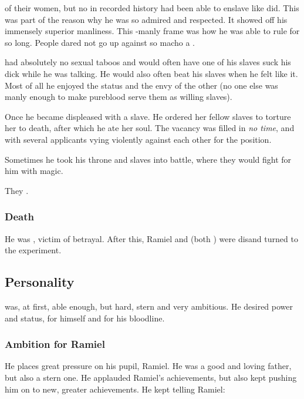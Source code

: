  of their women, but no \resphan{} in recorded history had been able to enslave \resviel{} like \Zachirah{} did. 
This was part of the reason why he was so admired and respected. 
It showed off his immensely superior manliness. 
This \uber-manly frame was how he was able to rule \Mystraacht{} for so long. 
People dared not go up against so macho a \resphan. 

\Zachirah{} had absolutely no sexual taboos and would often have one of his slaves suck his dick while he was talking. 
He would also often beat his slaves when he felt like it. 
Most of all he enjoyed the status and the envy of the other \resphain{} (no one else was manly enough to make pureblood \resviel{} serve them as willing slaves). 

Once he became displeased with a slave. 
He ordered her fellow slaves to torture her to death, after which he ate her soul. 
The vacancy was filled in \emph{no time}, and with several applicants vying violently against each other for the position. 

Sometimes he took his throne and slaves into battle, where they would fight for him with magic. 

They . 





\subsubsection{Death}
He was , victim of betrayal. 
After this, Ramiel and \Shiaraid{} (both \Mystraacht) were dis\honoured and turned to the \Malach{} experiment. 









\subsection{Personality}
\Zachirah{} was, at first, \honour{}able enough, but hard, stern and very ambitious. 
He desired power and status, for himself and for his bloodline. 





\subsubsection{Ambition for Ramiel}
He places great pressure on his pupil, Ramiel. 
He was a good and loving father, but also a stern one. 
He applauded Ramiel's achievements, but also kept pushing him on to new, greater achievements. 
He kept telling Ramiel: 





